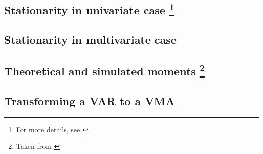 \documentclass[11pt]{article}
\newcommand*{\svar}{SVAR}
\newcommand*{\svarp}[1][p]{SVAR(#1)}
\begin{document}
% 

% 

\subsection{Stationarity in univariate case\texorpdfstring{%
        \protect\footnote{For more details, see \cite[][see Chapter 3, Stationary ARMA processes]{Hamilton-1994}}%
    }{}}


\subsection{Stationarity in multivariate case}


\subsection{Theoretical and simulated moments\texorpdfstring{%
        \protect\footnote{Taken from \cite[][see Sectiona 18, "Theoretical and simulated moments]{Mutschler-2018-github_repo}}%
    }{}}


\subsection{Transforming a VAR to a VMA}


% 









\end{document}
